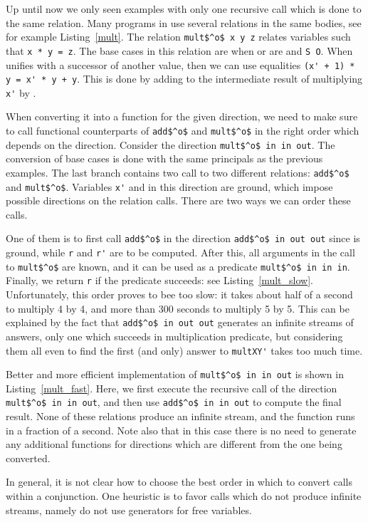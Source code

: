 Up until now we only seen examples with only one recursive call which is done to the same relation.
Many programs in \mk use several relations in the same bodies, see for example Listing~\ref{mult}.
The relation \lstinline[breaklines=true]{mult$^o$ x y z} relates variables such that \lstinline[breaklines=true]{x * y = z}.
The base cases in this relation are when \x or \y are \zero and \lstinline{S O}.
When \x unifies with a successor of another value, then we can use equalities \lstinline[breaklines=true]{(x' + 1) * y = x' * y + y}.
This is done by adding \y to the intermediate result of multiplying \lstinline{x'} by \y.

When converting it into a function for the given direction, we need to make sure to call functional counterparts of \lstinline{add$^o$} and \lstinline{mult$^o$} in the right order which depends on the direction.
Consider the direction \lstinline{mult$^o$ in in out}.
The conversion of base cases is done with the same principals as the previous examples.
The last \conde branch contains two call to two different relations: \lstinline{add$^o$} and \lstinline{mult$^o$}.
Variables \lstinline{x'} and \y in this direction are ground, which impose possible directions on the relation calls.
There are two ways we can order these calls.

One of them is to first call \lstinline{add$^o$} in the direction \lstinline[breaklines=true]{add$^o$ in out out} since \y is ground, while \lstinline{r} and \lstinline{r'} are to be computed.
After this, all arguments in the call to \lstinline{mult$^o$} are known, and it can be used as a predicate \lstinline[breaklines=true]{mult$^o$ in in in}.
Finally, we return \lstinline{r} if the predicate succeeds: see Listing~\ref{mult_slow}.
Unfortunately, this order proves to bee too slow: it takes about half of a second to multiply 4 by 4, and more than 300 seconds to multiply 5 by 5.
This can be explained by the fact that \lstinline[breaklines=true]{add$^o$ in out out} generates an infinite streams of answers, only one which succeeds in  multiplication predicate, but considering them all even to find the first (and only) answer to \lstinline{multXY'} takes too much time.

Better and more efficient implementation of \lstinline[breaklines=true]{mult$^o$ in in out} is shown in Listing~\ref{mult_fast}.
Here, we first execute the recursive call of the direction \lstinline[breaklines=true]{mult$^o$ in in out}, and then use \lstinline{add$^o$ in in out} to compute the final result.
None of these relations produce an infinite stream, and the function runs in a fraction of a second.
Note also that in this case there is no need to generate any additional functions for directions which are different from the one being converted.

In general, it is not clear how to choose the best order in which to convert calls within a conjunction.
One heuristic is to favor calls which do not produce infinite streams, namely do not use generators for free variables.

